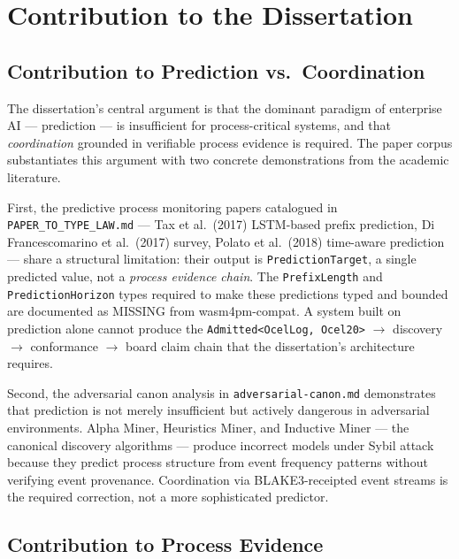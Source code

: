 
\section{Contribution to the Dissertation}
\label{sec:sources-papers-contribution}

\subsection{Contribution to Prediction vs.~Coordination}
\label{sec:sources-papers-contribution-prediction}

The dissertation's central argument is that the dominant paradigm of enterprise
AI --- prediction --- is insufficient for process-critical systems, and that
\emph{coordination} grounded in verifiable process evidence is required. The
paper corpus substantiates this argument with two concrete demonstrations from
the academic literature.

First, the predictive process monitoring papers catalogued in
\texttt{PAPER\_TO\_TYPE\_LAW.md} --- Tax et al.\ (2017) LSTM-based prefix
prediction, Di Francescomarino et al.\ (2017) survey, Polato et al.\ (2018)
time-aware prediction --- share a structural limitation: their output is
\texttt{PredictionTarget}, a single predicted value, not a \emph{process
evidence chain}. The \texttt{PrefixLength} and \texttt{PredictionHorizon} types
required to make these predictions typed and bounded are documented as MISSING
from wasm4pm-compat. A system built on prediction alone cannot produce the
\texttt{Admitted<OcelLog, Ocel20>} $\to$ discovery $\to$ conformance $\to$
board claim chain that the dissertation's architecture requires.

Second, the adversarial canon analysis in \texttt{adversarial-canon.md}
demonstrates that prediction is not merely insufficient but actively dangerous
in adversarial environments. Alpha Miner, Heuristics Miner, and Inductive
Miner --- the canonical discovery algorithms --- produce incorrect models under
Sybil attack because they predict process structure from event frequency
patterns without verifying event provenance. Coordination via BLAKE3-receipted
event streams is the required correction, not a more sophisticated predictor.

\subsection{Contribution to Process Evidence}
\label{sec:sources-papers-contribution-evidence}

